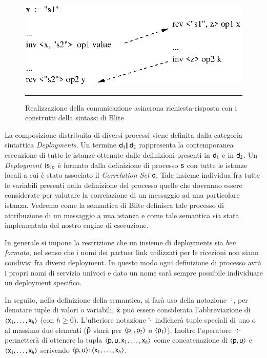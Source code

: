 \begin{figure}[t]
\begin{center}
  \includegraphics{linguaggio/dia/com}
   \caption[Comunicazione asincrona con Blite]{
   	\textsf{{\small Realizzazione della comunicazione asincrona
   	richiesta-risposta con i construtti della sintassi di Blite}} }
   	\rule{7cm}{0.01cm}
  \label{fig:lin:com}
\end{center}
\end{figure}

La composizione distribuita di diversi processi viene definita dalla categoria
sintattica \emph{Deployments}. Un termine ${\sf d}_1 \|\, {\sf d}_2$ rappresenta la
contemporanea esecuzione di tutte le istanze ottenute dalle
definizioni presenti in ${\sf d}_1$ e in ${\sf d}_2$. Un \emph{Deployment}
$\{ {\sf s} \}_{{\sf c}}$ è formato dalla definizione di processo ${\sf s}$ con tutte le 
istanze locali a cui è stato associato il \emph{Correlation Set} ${\sf c}$. Tale
insieme individua fra tutte le variabili presenti nella definizione del
processo quelle che dovranno essere considerate per valutare la correlazione di un messaggio
ad una particolare istanza. Vedremo come la semantica di Blite definisca tale
processo di attribuzione di un messaggio a una istanza e come tale
semantica sia stata implementata del nostro engine di esecuzione.
 
In generale si impone la restrizione che un insieme di deployments sia
\emph{ben formato}, nel senso che i nomi dei partner link utilizzati per le
ricezioni non siano condivisi fra diversi deployment. In questo modo ogni
definizione di processo avrà i propri nomi di servizio univoci e dato un nome
sarà sempre possibile individuare un deployment specifico.

In seguito, nella definizione della semantica, si farà uso della notazione
$\bar{\cdot}$, per denotare tuple di valori o variabili, $\bar{{\sf x}}$ può
essere considerata l'abbreviazione di $\langle {\sf x}_1,
\ldots, {\sf x}_h \rangle$ (con $h \geq 0$). L'ulteriore notazione $\tilde{\cdot}$
indicherà tuple speciali di uno o al massimo due elementi ($\tilde{{\sf p}}$ starà
per $\langle {\sf p}_1, {\sf p}_2 \rangle$ o $\langle {\sf p}_1 \rangle$). Inoltre l'operatore
${\sf \cdot}\! : \! {\sf \cdot}$ permetterà di ottenere la tupla $\langle {\sf p},
{\sf u},{\sf x}_1,\ldots,{\sf x}_h \rangle$ come concatenazione di $\langle {\sf p}, {\sf u} \rangle$ e
$\langle {\sf x}_1,\ldots,{\sf x}_h \rangle$ scrivendo $\langle {\sf p},
{\sf u} \rangle\! : \! \langle {\sf x}_1,\ldots,{\sf x}_h \rangle$.
\\

